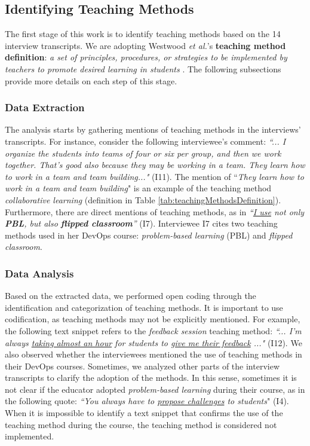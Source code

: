 \documentclass[10pt,conference]{IEEEtran}
\begin{document}
\subsection{Identifying Teaching Methods}

The first stage of this work is to identify teaching methods based on the 14 interview transcripts. We are adopting Westwood \textit{et al.}'s \cite{westwood:2008} \textbf{teaching method definition}: \textit{a set of principles, procedures, or strategies to be implemented by teachers to promote desired learning in students} \cite{bjork:2017, liu:2007}. The following subsections provide more details on each step of this stage.


\subsubsection{Data Extraction}

The analysis starts by gathering mentions of teaching methods in the interviews' transcripts. For instance, consider the following interviewee's comment: \textit{``... I organize the students into teams of four or six per group, and then we work together. That's good also because they may be working in a team. They learn how to work in a team and team building..."} (I11). The mention of ``\textit{They learn how to work in a team and team building}" is an example of the teaching method \textsl{collaborative learning} (definition in Table \ref{tab:teachingMethodsDefinition}). 
Furthermore, 
there are direct mentions of teaching methods, as in \textit{``\underline{I use} not only \textbf{PBL}, but also \textbf{flipped classroom}''} (I7). 
Interviewee I7 cites two teaching methods used in her DevOps course: \textsl{problem-based learning} (PBL) and \textsl{flipped classroom}.

\subsubsection{Data Analysis}

Based on the extracted data, we performed open coding through the identification and categorization of teaching methods. It is important to use codification, as teaching methods may not be explicitly mentioned. For example, the following text snippet refers to the \textsl{feedback session} teaching method: \textit{``... I'm always \underline{taking almost an hour} for students to \underline{give me their feedback} ..."} (I12). We also observed whether the interviewees mentioned the use of teaching methods in their DevOps courses. Sometimes, we analyzed other parts of the interview transcripts to clarify the adoption of the methods. In this sense, sometimes it is not clear if the educator adopted \textsl{problem-based learning} during their course, as in the following quote: \textit{``You always have to \underline{propose challenges} to students}" (I4). When it is impossible to identify a text snippet that confirms the use of the teaching method during the course, the teaching method is considered not implemented.  
\end{document}
